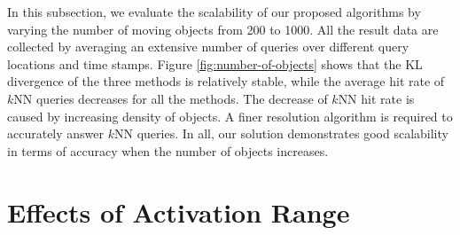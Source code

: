 \documentclass[12pt]{report}
\begin{document}
In this subsection, we evaluate the scalability of our proposed
algorithms by varying the number of moving objects from 200
to 1000.  All the result data are collected by averaging an
extensive number of queries over different query locations and
time stamps.  Figure \ref{fig:number-of-objects} shows that the KL
divergence of the three methods is relatively stable, while the
average hit rate of \(k\)NN queries decreases for all the methods.
The decrease of \(k\)NN hit rate is caused by increasing density
of objects.  A finer resolution algorithm is required to
accurately answer \(k\)NN queries.  In all, our solution
demonstrates good scalability in terms of accuracy when the number
of objects increases.

\section{Effects of Activation Range}
\label{sec:orge8c00a8}
\end{document}
